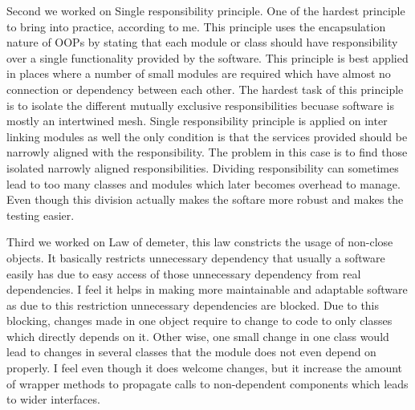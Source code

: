 \documentclass[12pt]{article}
\begin{document}
Second we worked on Single responsibility principle. One of the hardest principle to bring into practice, according to me. This principle uses the encapsulation nature of OOPs by stating that each module or class should have responsibility over a single functionality provided by the software. This principle is best applied in places where a number of small modules are required which have almost no connection or dependency between each other. The hardest task of this principle is to isolate the different mutually exclusive responsibilities becuase software is mostly an intertwined mesh. Single responsibility principle is applied on inter linking modules as well the only condition is that the services provided should be narrowly aligned with the responsibility. The problem in this case is to find those isolated narrowly aligned responsibilities. Dividing responsibility can sometimes lead to too many classes and modules which later becomes overhead to manage. Even though this division actually makes the softare more robust and makes the testing easier.

Third we worked on Law of demeter, this law constricts the usage of non-close objects. It basically restricts unnecessary dependency that usually a software easily has due to easy access of those unnecessary dependency from real dependencies. I feel it helps in making more maintainable and adaptable software as due to this restriction unnecessary dependencies are blocked. Due to this blocking, changes made in one object require to change to code to only classes which directly depends on it. Other wise, one small change in one class would lead to changes in several classes that the module does not even depend on properly. I feel even though it does welcome changes, but it increase the amount of wrapper methods to propagate calls to non-dependent components which leads to wider interfaces.
\end{document}
